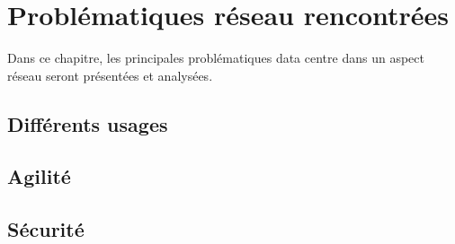 \chapter{Problématiques réseau rencontrées}
Dans ce chapitre, les principales problématiques data centre dans un aspect réseau seront présentées et analysées.

\section{Différents usages}

\section{Agilité}

\section{Sécurité}